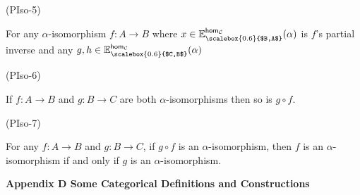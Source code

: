 \documentclass[10pt,a4paper]{article}
\begin{document}
\begin{center}\end{center}
 
 
 
\par\noindent  (PIso-5) 
 
For any $\alpha$-isomorphism $f:A\to B$ where $x\in\mathbb{E}^{\mathsf{hom}_{\mathcal{C}}}_{\scalebox{0.6}{$B,A$}}(\alpha)$ is $f$’s partial inverse and any $g,h\in\mathbb{E}^{\mathsf{hom}_{\mathcal{C}}}_{\scalebox{0.6}{$C,B$}}(\alpha)$\par
 
\begin{center}\end{center}
 
 
 
\par\noindent  (PIso-6) 
 
If $f:A\to B$ and $g:B\to C$ are both $\alpha$-isomorphisms then so is $g\circ f$.\par
 
 
 
\par\noindent  (PIso-7) 
 
For any $f:A\to B$ and $g:B\to C$, if $g\circ f$ is an $\alpha$-isomorphism, then $f$ is an $\alpha$-isomorphism if and only if $g$ is an $\alpha$-isomorphism.\par
 
 
  
 
 


 
\par\medskip\noindent\textbf{Appendix D Some Categorical Definitions and Constructions}\par
 
\end{document}
